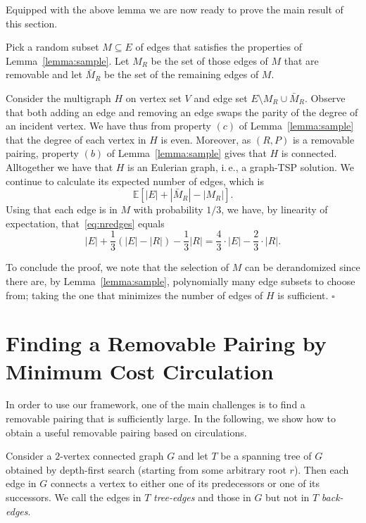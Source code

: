 \documentclass[letterpaper,11pt]{article}
\newenvironment{proofof}[1]{\begin{trivlist}
    \item[\hskip\labelsep {\bf Proof of #1.}]}{\QED \end{trivlist}}
\newcommand{\QED}{\hfill $\square$}
\newcommand{\MS}{\ensuremath{\mbox{removable pairing}}\xspace}
\newcommand{\TSP}{graph-TSP\xspace}
\begin{document}
Equipped with the above lemma we are now ready to prove the main result
of this section.
\begin{proofof}{Theorem~\ref{thm:main}}
  Pick a random subset $M \subseteq E$ of edges that satisfies the
  properties of Lemma~\ref{lemma:sample}. Let $M_R$ be the set of those edges of
  $M$ that are removable and let $\bar M_R$ be the set of the remaining edges of
  $M$.

Consider the multigraph $H$ on vertex set $V$ and edge set $E
\setminus M_R \cup \bar M_R$. Observe that both adding an edge and
removing an edge swaps the parity of the degree of an incident
vertex. We have thus from property $(c)$ of Lemma~\ref{lemma:sample}
that the degree of each vertex in $H$ is even. Moreover, as $(R,P)$ is a
removable pairing, property $(b)$ of Lemma~\ref{lemma:sample}
gives that $H$ is connected. Alltogether we have that $H$ is an
Eulerian graph, i.\,e., a \TSP{} solution. We continue to calculate its
expected number of edges, which is
\begin{equation}
\label{eq:nredges}
\mathbb{E}[|E| +   |\bar M_R| -
|M_R|].
\end{equation} 
Using that each edge is in $M$ with probability $1/3$,  we have, by linearity of
expectation, that~\eqref{eq:nredges} equals
$$
|E| + \frac{1}{3} (|E| - |R|) - \frac{1}{3} |R| = \frac{4}{3} \cdot |E| - \frac{2}{3} \cdot |R|.
$$ 

To conclude the proof, we note that the selection of $M$ can be
derandomized since there are, by Lemma~\ref{lemma:sample},
polynomially many edge subsets to choose from; taking the one that
minimizes the number of edges of $H$  is sufficient.
\end{proofof}

\section{Finding a Removable Pairing by Minimum Cost Circulation}\label{sec:circulation}
In order to use our framework, one of the main challenges is to find a
\MS{} that is sufficiently large. In the following, we show how to obtain a
useful \MS{} based on circulations.

Consider a $2$-vertex connected graph $G$ and let $T$ be a spanning
tree of $G$ obtained by depth-first search (starting from some
arbitrary root $r$). Then each edge in $G$ connects a vertex to either
one of its predecessors or one of its successors. We call the edges in
$T$ \emph{tree-edges} and those in $G$ but not in $T$
\emph{back-edges}.
\end{document}
